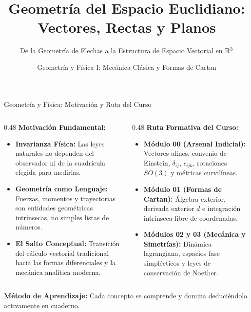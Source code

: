 \documentclass[10pt,aspectratio=169]{beamer}
\title[Semana 1: Vectores, Rectas y Planos]{Geometría del Espacio Euclidiano: Vectores, Rectas y Planos}
\subtitle{De la Geometría de Flechas a la Estructura de Espacio Vectorial en $\mathbb{R}^3$}
\author{Geometría y Física I: Mecánica Clásica y Formas de Cartan}
\institute{}
\date{}
\begin{document}
\setlength{\abovedisplayskip}{3pt}
\setlength{\belowdisplayskip}{3pt}

\begin{frame}
  \titlepage
\end{frame}

\begin{frame}{Geometría y Física: Motivación y Ruta del Curso}
  \begin{columns}[t]
    \begin{column}{0.48\textwidth}
      \footnotesize
      \textbf{Motivación Fundamental:}
      \begin{itemize}\itemsep6pt
        \item \textbf{Invarianza Física:}
        Las leyes naturales no dependen del observador ni de la cuadrícula elegida para medirlas.
        \item \textbf{Geometría como Lenguaje:}
        Fuerzas, momentos y trayectorias son entidades geométricas intrínsecas, no simples listas de números.
        \item \textbf{El Salto Conceptual:}
        Transición del cálculo vectorial tradicional hacia las formas diferenciales y la mecánica analítica moderna.
      \end{itemize}
    \end{column}
    \begin{column}{0.48\textwidth}
      \footnotesize
      \textbf{Ruta Formativa del Curso:}
      \begin{itemize}\itemsep6pt
        \item \textbf{Módulo 00 (Arsenal Indicial):}
        Vectores afines, convenio de Einstein, $\delta_{ij}$, $\epsilon_{ijk}$, rotaciones $SO(3)$ y métricas curvilíneas.
        \item \textbf{Módulo 01 (Formas de Cartan):}
        Álgebra exterior, derivada exterior $d$ e integración intrínseca libre de coordenadas.
        \item \textbf{Módulos 02 y 03 (Mecánica y Simetrías):}
        Dinámica lagrangiana, espacios fase simplécticos y leyes de conservación de Noether.
      \end{itemize}
    \end{column}
  \end{columns}
  \vspace{0.3cm}
  \centering
  \footnotesize
  \textbf{Método de Aprendizaje:} Cada concepto se comprende y domina deduciéndolo activamente en cuaderno.
\end{frame}
\end{document}
